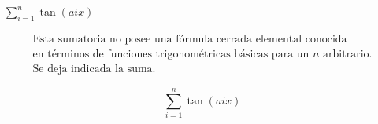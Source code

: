$\displaystyle \sum_{i=1}^{n} \tan(aix)$

\nopagebreak
\begin{align*}
\text{Esta sumatoria no posee una fórmula cerrada elemental conocida} \\
\text{en términos de funciones trigonométricas básicas para un } n \text{ arbitrario.} \\
\text{Se deja indicada la suma.}
\end{align*}

\[
\boxed{\displaystyle \sum_{i=1}^{n} \tan(aix)}
\]
